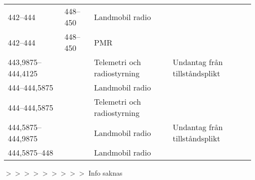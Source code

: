 \documentclass[10pt,swedish,a4paper,twoside]{article}
\begin{document}
\begin{landscape}
\begin{longtable}{llll}
	442--444           & 448--450        & Landmobil radio             &  \\
	442--444           & 448--450        & PMR                         &  \\
	443,9875--444,4125 &                 & Telemetri och radiostyrning & Undantag från tillståndsplikt   \\
	444--444,5875      &                 & Landmobil radio             &  \\
	444--444,5875      &                 & Telemetri och radiostyrning &  \\
	444,5875--444,9875 &                 & Landmobil radio             & Undantag från tillståndsplikt   \\
	444,5875--448      &                 & Landmobil radio             &
\end{longtable}
$>>>>>>>>>$ Info saknas

\end{landscape}
\end{document}
